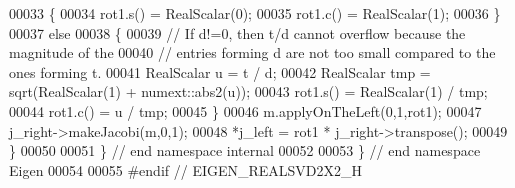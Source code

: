 \begin{DoxyCode}
00033   \{
00034     rot1.s() = RealScalar(0);
00035     rot1.c() = RealScalar(1);
00036   \}
00037   \textcolor{keywordflow}{else}
00038   \{
00039     \textcolor{comment}{// If d!=0, then t/d cannot overflow because the magnitude of the}
00040     \textcolor{comment}{// entries forming d are not too small compared to the ones forming t.}
00041     RealScalar u = t / d;
00042     RealScalar tmp = sqrt(RealScalar(1) + numext::abs2(u));
00043     rot1.s() = RealScalar(1) / tmp;
00044     rot1.c() = u / tmp;
00045   \}
00046   m.applyOnTheLeft(0,1,rot1);
00047   j\_right->makeJacobi(m,0,1);
00048   *j\_left = rot1 * j\_right->transpose();
00049 \}
00050 
00051 \} \textcolor{comment}{// end namespace internal}
00052 
00053 \} \textcolor{comment}{// end namespace Eigen}
00054 
00055 \textcolor{preprocessor}{#endif // EIGEN\_REALSVD2X2\_H}
\end{DoxyCode}
